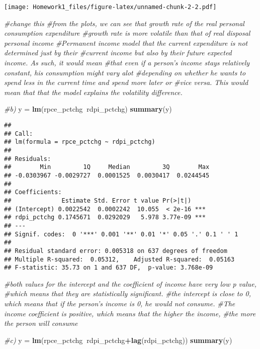 \documentclass[]{article}
\newenvironment{Shaded}{\begin{snugshade}}{\end{snugshade}}
\newcommand{\KeywordTok}[1]{\textcolor[rgb]{0.13,0.29,0.53}{\textbf{#1}}}
\newcommand{\StringTok}[1]{\textcolor[rgb]{0.31,0.60,0.02}{#1}}
\newcommand{\CommentTok}[1]{\textcolor[rgb]{0.56,0.35,0.01}{\textit{#1}}}
\newcommand{\OperatorTok}[1]{\textcolor[rgb]{0.81,0.36,0.00}{\textbf{#1}}}
\newcommand{\NormalTok}[1]{#1}
\begin{document}
\texttt{[image: Homework1\_files/figure-latex/unnamed-chunk-2-2.pdf]}

\begin{Shaded}
\begin{Highlighting}[]
\CommentTok{#change this}
\CommentTok{#from the plots, we can see that growth rate of the real personal consumption expenditure}
\CommentTok{#growth rate is more volatile than that of real disposal personal income}
\CommentTok{#Permanent income model that the current expenditure is not determined just by their }
\CommentTok{#current income but also by their future expected income. As such, it would mean }
\CommentTok{#that even if a person's income stays relatively constant, his consumption might vary alot }
\CommentTok{#depending on whether he wants to spend less in the current time and spend more later or}
\CommentTok{#vice versa. This would mean that that the model explains the volatility difference.}

\CommentTok{#b)}
\NormalTok{y =}\StringTok{ }\KeywordTok{lm}\NormalTok{(rpce_pctchg}\OperatorTok{~}\NormalTok{rdpi_pctchg)}
\KeywordTok{summary}\NormalTok{(y)}
\end{Highlighting}
\end{Shaded}

\begin{verbatim}
## 
## Call:
## lm(formula = rpce_pctchg ~ rdpi_pctchg)
## 
## Residuals:
##        Min         1Q     Median         3Q        Max 
## -0.0303967 -0.0029727  0.0001525  0.0030417  0.0244545 
## 
## Coefficients:
##              Estimate Std. Error t value Pr(>|t|)    
## (Intercept) 0.0022542  0.0002242  10.055  < 2e-16 ***
## rdpi_pctchg 0.1745671  0.0292029   5.978 3.77e-09 ***
## ---
## Signif. codes:  0 '***' 0.001 '**' 0.01 '*' 0.05 '.' 0.1 ' ' 1
## 
## Residual standard error: 0.005318 on 637 degrees of freedom
## Multiple R-squared:  0.05312,    Adjusted R-squared:  0.05163 
## F-statistic: 35.73 on 1 and 637 DF,  p-value: 3.768e-09
\end{verbatim}

\begin{Shaded}
\begin{Highlighting}[]
\CommentTok{#both values for the intercept and the coefficient of income have very low p value,}
\CommentTok{#which means that they are statistically significant.}
\CommentTok{#the intercept is close to 0, which means that if the person's income is 0, he would not consume. }
\CommentTok{#The income coefficient is positive, which means that the higher the income,}
\CommentTok{#the more the person will consume}

\CommentTok{#c)}
\NormalTok{y =}\StringTok{ }\KeywordTok{lm}\NormalTok{(rpce_pctchg}\OperatorTok{~}\NormalTok{rdpi_pctchg}\OperatorTok{+}\KeywordTok{lag}\NormalTok{(rdpi_pctchg))}
\KeywordTok{summary}\NormalTok{(y)}
\end{Highlighting}
\end{Shaded}
\end{document}
